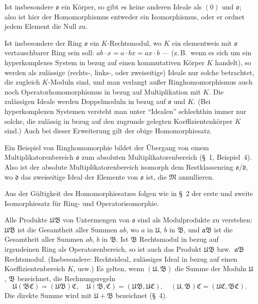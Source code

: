 \documentclass[12pt,a4paper]{article}
\theoremstyle{definition}
\begin{document}
Ist insbesondere $\mathfrak{o}$ ein K\"orper, so gibt es keine anderen
Ideale als $(0)$ und $\mathfrak{o}$; also ist hier der Homomorphismus
entweder ein Isomorphismus, oder er ordnet jedem Element die Null zu.

Ist insbesondere der Ring $\mathfrak{o}$ ein $K$-Rechtsmodul, wo $K$ ein
elementweis mit $\mathfrak{o}$ vertauschbarer Ring sein soll:
$ab \cdot x = a \cdot bx = ax \cdot b$ --- (z.\,B.\ wenn es sich um ein
hyperkomplexes System in bezug auf einen kommutativen K\"orper $K$
handelt), so werden als zul\"assige (rechts-, links-, oder zweiseitige)
Ideale nur solche betrachtet, die zugleich $K$-Moduln sind, und man
verlangt au\ss er Ringhomomorphismus auch noch Operatorhomomorphismus in
bezug auf Multiplikation mit $K$. Die zul\"assigen Ideale werden
Doppelmoduln in bezug auf $\mathfrak{o}$ und $K$. (Bei hyperkomplexen
Systemen versteht man unter ``Idealen'' schlechthin immer nur solche,
die zul\"assig in bezug auf den zugrunde gelegten Koeffizientenk\"orper
$K$ sind.) Auch bei dieser Erweiterung gilt der obige
Homomorphiesatz.

\medskip

Ein Beispiel von Ringhomomorphie bildet der \"Ubergang von einem
Multiplikatorenbereich $\mathfrak{o}$ zum absoluten Multiplikatorenbereich
(\S~1, Beispiel~4). Also ist der absolute Multiplikatorenbereich
isomorph dem Restklassenring $\mathfrak{o}/\mathfrak{d}$, wo
$\mathfrak{d}$ das zweiseitige Ideal der Elemente von $\mathfrak{o}$
ist, die $\mathfrak{M}$ annullieren.

Aus der G\"ultigkeit des Homomorphiesatzes folgen wie in \S~2 der erste
und zweite Isomorphiesatz f\"ur Ring- und Operatorisomorphie.

Alle Produkte $\mathfrak{U}\mathfrak{B}$ von Untermengen von
$\mathfrak{o}$ sind als Modulprodukte zu verstehen:
$\mathfrak{U}\mathfrak{B}$ ist die Gesamtheit aller Summen $ab$, wo $a$
in $\mathfrak{U}$, $b$ in $\mathfrak{B}$, und $\mathfrak{a}\mathfrak{B}$
ist die Gesamtheit aller Summen $ab$, $b$ in $\mathfrak{B}$. Ist
$\mathfrak{B}$ Rechtsmodul in bezug auf irgendeinen Ring als
Operatorenbereich, so ist auch das Produkt $\mathfrak{U}\mathfrak{B}$
bzw.\ $\mathfrak{a}\mathfrak{B}$ Rechtsmodul. (Insbesondere:
Rechtsideal, zul\"assiges Ideal in bezug auf einen Koeffizientenbereich
$K$, usw.) Es gelten, wenn $(\mathfrak{U}, \mathfrak{B})$ die Summe der
Moduln $\mathfrak{U}$, $\mathfrak{B}$ bezeichnet, die Rechnungsregeln
\[
\mathfrak{U}(\mathfrak{B}\mathfrak{C}) =
(\mathfrak{U}\mathfrak{B})\mathfrak{C}, \quad
\mathfrak{U}(\mathfrak{B}, \mathfrak{C}) =
(\mathfrak{U}\mathfrak{B}, \mathfrak{U}\mathfrak{C}), \quad
(\mathfrak{U}, \mathfrak{B})\mathfrak{C} =
(\mathfrak{U}\mathfrak{C}, \mathfrak{B}\mathfrak{C}).
\]
Die direkte Summe wird mit $\mathfrak{U} + \mathfrak{B}$ bezeichnet
(\S~4).
\end{document}
